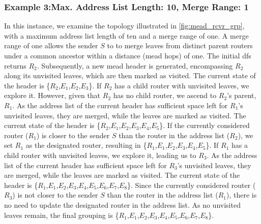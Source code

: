 \subsubsection{Example 3:\quad Max. Address List Length: 10, Merge Range: 1} %
\label{sec:Max 10 Merge 1}
In this instance, we examine the topology illustrated in \autoref{fig:mead_rcvr_grp},
    with a maximum address list length of ten and a merge range of one.
A merge range of one allows the sender $S$ to to merge leaves from distinct parent 
    routers under a common ancestor within a distance (\gls{mead} hops) of one.
The initial \gls{dfs} returns $R_2$.
Subsequently, a new \gls{mead} header is generated, encompassing $R_2$ along its
    unvisited leaves, which are then marked as visited.
The current state of the header is \{$R_2$,$E_1$,$E_2$,$E_3$\}.
If $R_2$ has a child router with unvisited leaves, we explore it.
However, given that $R_2$ has no child router, we ascend to $R_2$'s parent, $R_1$.
As the address list of the current header has sufficient space left for $R_1$'s
    unvisited leaves, they are merged, while the leaves are marked as visited.
The current state of the header is \{$R_2$,$E_1$,$E_2$,$E_3$,$E_4$,$E_5$\}.
If the currently considered router ($R_1$) is closer to the sender $S$ than the
    router in the address list ($R_2$), we set $R_1$ as the designated
    router, resulting in \{$R_1$,$E_1$,$E_2$,$E_3$,$E_4$,$E_5$\}.
If $R_1$ has a child router with unvisited leaves, we explore it, leading us to
    $R_3$.
As the address list of the current header has sufficient space left for $R_3$'s
    unvisited leaves, they are merged, while the leaves are marked as visited.
The current state of the header is
    \{$R_1$,$E_1$,$E_2$,$E_3$,$E_4$,$E_5$,$E_6$,$E_7$,$E_8$\}.
Since the currently considered router ($R_3$) is not closer to the sender $S$ than
    the router in the address list ($R_1$), there is no need to update the
    designated router in the address list.
As no unvisited leaves remain, the final grouping is
    \{$R_1$,$E_1$,$E_2$,$E_3$,$E_4$,$E_5$,$E_6$,$E_7$,$E_8$\}.

